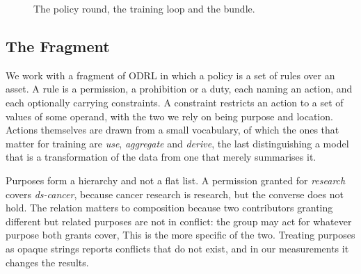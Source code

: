 \documentclass[10pt,conference]{IEEEtran}
\begin{document}
\begin{figure}[t]
\centering
{}
\caption{The policy round, the training loop and the bundle.}
\label{fig:pipeline}
\end{figure}

\subsection{The Fragment}

We work with a fragment of ODRL in which a policy is a set of rules over an
asset. A rule is a permission, a prohibition or a duty, each naming an action,
and each optionally carrying constraints. A constraint restricts an action to a
set of values of some operand, with the two we rely on being purpose and
location. Actions themselves are drawn from a small vocabulary, of which the
ones that matter for training are \emph{use}, \emph{aggregate} and
\emph{derive}, the last distinguishing a model that is a transformation of the
data from one that merely summarises it.

Purposes form a hierarchy and not a flat list. A permission granted for
\emph{research} covers \emph{ds-cancer}, because cancer research is research,
but the converse does not hold. The relation matters to composition because two
contributors granting different but related purposes are not in conflict: the
group may act for whatever purpose both grants cover, This is the more specific
of the two. Treating purposes as opaque strings reports conflicts that do not
exist, and in our measurements it changes the results.
\end{document}
